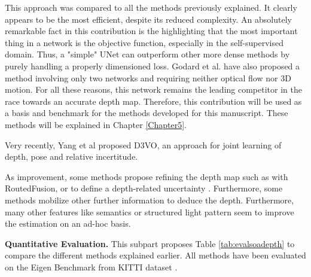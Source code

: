 This approach was compared to all the methods previously explained. It clearly appears to be the most efficient, despite its reduced complexity. An absolutely remarkable fact in this contribution is the highlighting that the most important thing in a network is the objective function, especially in the self-supervised domain. Thus, a "simple" UNet can outperform other more dense methods by purely handling a properly dimensioned loss. Godard et al. have also proposed a method involving only two networks and requiring neither optical flow nor 3D motion. 
For all these reasons, this network remains the leading competitor in the race towards an accurate depth map. Therefore, this contribution will be used as a basis and benchmark for the methods developed for this manuscript. These methods will be explained in Chapter \ref{Chapter5}.



Very recently, Yang et al \cite{yang2020d3vo} proposed D3VO, an approach for joint learning of depth, pose and relative incertitude.


As improvement, some methods propose refining the depth map such as \cite{weder2020routedfusion} with RoutedFusion, or to define a depth-related uncertainty \cite{poggi2020uncertainty}.
Furthermore, some methods mobilize other further information to deduce the depth. Furthermore, many other features like semantics \cite{chen2019towards} or structured light pattern \cite{riegler2019connecting} seem to improve the estimation on an ad-hoc basis.




\textbf{Quantitative Evaluation.} This subpart proposes Table \ref{tab:evalsoadepth} to compare the different methods explained earlier. All methods have been evaluated on the Eigen Benchmark from KITTI dataset \cite{Geiger2012CVPR}.

